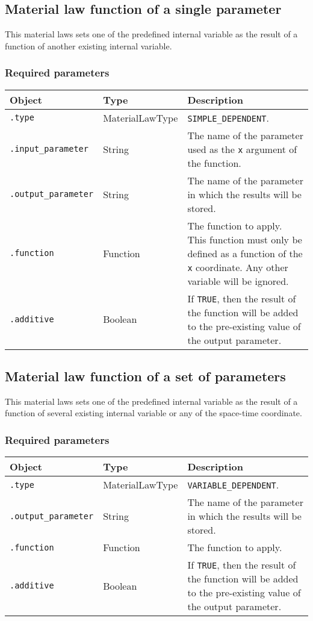 \documentclass[10pt]{article}
\begin{document}
\subsection{Material law function of a single parameter}

This material laws sets one of the predefined internal variable as the result of a function of another existing internal variable.

\subsubsection*{Required parameters}

\begin{tabularx}{\textwidth}{llX}
\hline 
Object & Type & Description \\ 
\hline 
\verb+.type+ & MaterialLawType & \verb+SIMPLE_DEPENDENT+. \\ 
\verb+.input_parameter+ & String & The name of the parameter used as the \verb+x+ argument of the function.\\
\verb+.output_parameter+ & String & The name of the parameter in which the results will be stored.\\
\verb+.function+ & Function & The function to apply. This function must only be defined as a function of the \verb+x+ coordinate. Any other variable will be ignored. \\
\verb+.additive+ & Boolean & If \verb+TRUE+, then the result of the function will be added to the pre-existing value of the output parameter.\\
\hline 
\end{tabularx}

\subsection{Material law function of a set of parameters}

This material laws sets one of the predefined internal variable as the result of a function of several existing internal variable or any of the space-time coordinate.

\subsubsection*{Required parameters}

\begin{tabularx}{\textwidth}{llX}
\hline 
Object & Type & Description \\ 
\hline 
\verb+.type+ & MaterialLawType & \verb+VARIABLE_DEPENDENT+. \\ 
\verb+.output_parameter+ & String & The name of the parameter in which the results will be stored.\\
\verb+.function+ & Function & The function to apply. \\
\verb+.additive+ & Boolean & If \verb+TRUE+, then the result of the function will be added to the pre-existing value of the output parameter.\\
\hline 
\end{tabularx}
\end{document}

